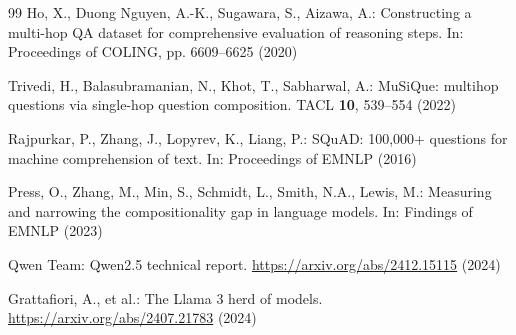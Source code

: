 ﻿\documentclass[11pt]{article}
\begin{document}
\begin{thebibliography}{99}
Ho, X., Duong Nguyen, A.-K., Sugawara, S., Aizawa, A.: Constructing a multi-hop QA dataset for
comprehensive evaluation of reasoning steps. In: Proceedings of COLING, pp. 6609--6625 (2020)

Trivedi, H., Balasubramanian, N., Khot, T., Sabharwal, A.: MuSiQue: multihop questions via
single-hop question composition. TACL \textbf{10}, 539--554 (2022)

Rajpurkar, P., Zhang, J., Lopyrev, K., Liang, P.: SQuAD: 100,000+ questions for machine
comprehension of text. In: Proceedings of EMNLP (2016)

Press, O., Zhang, M., Min, S., Schmidt, L., Smith, N.A., Lewis, M.: Measuring and narrowing the
compositionality gap in language models. In: Findings of EMNLP (2023)

Qwen Team: Qwen2.5 technical report. \url{https://arxiv.org/abs/2412.15115} (2024)

Grattafiori, A., et al.: The Llama 3 herd of models. \url{https://arxiv.org/abs/2407.21783}
(2024)

\end{thebibliography}
\end{document}
